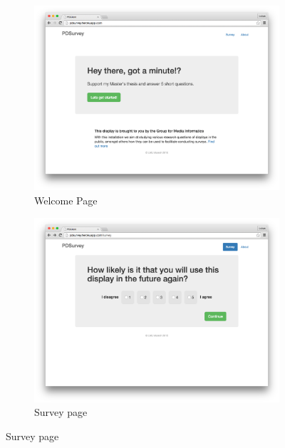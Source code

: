 		\begin{figure}
		    \centering
		    \begin{subfigure}[b]{0.6\textwidth}
		        \centering
		        \includegraphics[width=\textwidth]{img/screenshots/pdclient/welcome}
		        \caption{Welcome Page}
		        \label{fig:4-pdclient-welcome}
		    \end{subfigure}
		    \hfill
		    \begin{subfigure}[b]{0.6\textwidth}
		        \centering
		        \includegraphics[width=\textwidth]{img/screenshots/pdclient/survey}
		        \caption{Survey page}
		        \label{fig:4-pdclient-survey}
		    \end{subfigure}
		    \hfill

\end{figure}
